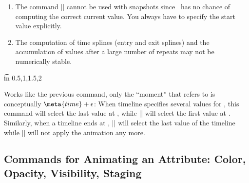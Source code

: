 \begin{command}{\pgfsysanimsnapshot{}}
\begin{enumerate}
            However, there is one command which helps you with ``simulating''
            the effect of events:
            \begin{command}{\pgfsysanimkeysnapshotstart{}}
                This command specifies that for the current animation the
                ``moment |0s|'' of the timeline is at . Thus,
                it works like |\pgfsysanimkeyoffset|, only the offset is now
                solely for the snapshot timeline. It has no effect on the
                actual animation.
            \end{command}
        \item The command |\pgfsysanimvalcurrent| cannot be used with snapshots
            since \pgfname\ has no chance of computing the correct current
            value. You always have to specify the start value explicitly.
        \item The computation of time splines (entry and exit splines) and the
            accumulation of values after a large number of repeats may not be
            numerically stable.
    \end{enumerate}
\begin{codeexample}[width=5cm,preamble={\usetikzlibrary{animations}}]
\foreach \t in {0.5,1,1.5,2} {
  \pgfsysanimsnapshot{\t}
}
\end{codeexample}
\end{command}

\begin{command}{\pgfsysanimsnapshotafter{}}
    Works like the previous command, only the ``moment'' that 
    refers to is conceptually $\meta{time} + \epsilon$: When timeline specifies
    several values for , this command will select the last value at
    , while |\pgfsnapshot| will select the first value at
    . Similarly, when a timeline ends at , |\pgfsnapshot|
    will select the last value of the timeline while |\pgfsnapshotafter| will
    not apply the animation any more.
\end{command}


\subsection{Commands for Animating an Attribute: Color, Opacity, Visibility, Staging}

